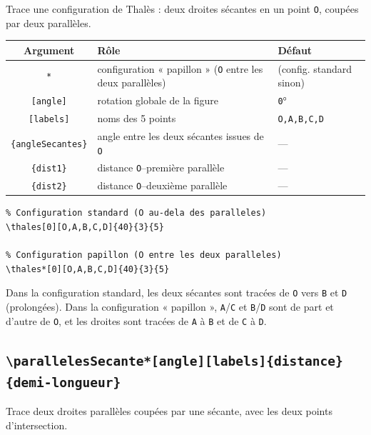 \documentclass[11pt,a4paper]{article}
\newcommand{\cmdname}[1]{\texttt{\textbackslash#1}}
\begin{document}
Trace une configuration de Thalès : deux droites sécantes en un point \texttt{O}, coupées par deux parallèles.

\begin{center}
\begin{tabular}{@{}cll@{}}
\toprule
\textbf{Argument} & \textbf{Rôle} & \textbf{Défaut} \\
\midrule
\texttt{*} & configuration « papillon » (\texttt{O} entre les deux parallèles) & (config. standard sinon) \\
\texttt{[angle]} & rotation globale de la figure & \texttt{0}° \\
\texttt{[labels]} & noms des 5 points & \texttt{O,A,B,C,D} \\
\texttt{\{angleSecantes\}} & angle entre les deux sécantes issues de \texttt{O} & --- \\
\texttt{\{dist1\}} & distance \texttt{O}--première parallèle & --- \\
\texttt{\{dist2\}} & distance \texttt{O}--deuxième parallèle & --- \\
\bottomrule
\end{tabular}
\end{center}

\begin{lstlisting}
% Configuration standard (O au-dela des paralleles)
\thales[0][O,A,B,C,D]{40}{3}{5}

% Configuration papillon (O entre les deux paralleles)
\thales*[0][O,A,B,C,D]{40}{3}{5}
\end{lstlisting}

Dans la configuration standard, les deux sécantes sont tracées de \texttt{O} vers \texttt{B} et \texttt{D} (prolongées). Dans la configuration « papillon », \texttt{A}/\texttt{C} et \texttt{B}/\texttt{D} sont de part et d'autre de \texttt{O}, et les droites sont tracées de \texttt{A} à \texttt{B} et de \texttt{C} à \texttt{D}.

\subsection{\cmdname{parallelesSecante*[angle][labels]\{distance\}\{demi-longueur\}}}

Trace deux droites parallèles coupées par une sécante, avec les deux points d'intersection.
\end{document}
